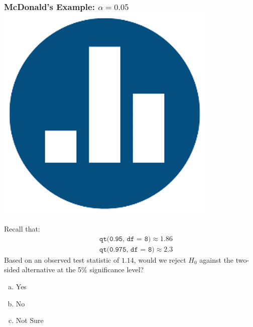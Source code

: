 \begin{frame}[t]
\frametitle{McDonald's Example: $\alpha = 0.05$\hfill \includegraphics[scale = 0.05]{./images/clicker}}
Recall that:
\begin{eqnarray*}
		&&\texttt{qt(0.95, df  = 8)}\approx 1.86\\
		 &&\texttt{qt(0.975, df  = 8)}\approx 2.3
	\end{eqnarray*}
Based on an observed test statistic of $1.14$, would we reject $H_0$ against the \alert{two-sided} alternative at the 5\% significance level?
\begin{enumerate}[(a)]
	\item Yes
	\item No
	\item Not Sure
\end{enumerate}

\end{frame}


